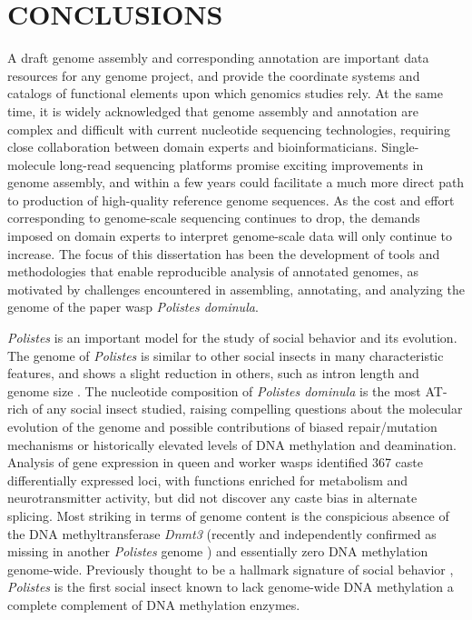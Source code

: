 \chapter{CONCLUSIONS}

A draft genome assembly and corresponding annotation are important data resources for any genome project, and provide the coordinate systems and catalogs of functional elements upon which genomics studies rely.
At the same time, it is widely acknowledged that genome assembly and annotation are complex and difficult with current nucleotide sequencing technologies, requiring close collaboration between domain experts and bioinformaticians.
Single-molecule long-read sequencing platforms promise exciting improvements in genome assembly, and within a few years could facilitate a much more direct path to production of high-quality reference genome sequences.
As the cost and effort corresponding to genome-scale sequencing continues to drop, the demands imposed on domain experts to interpret genome-scale data will only continue to increase.
The focus of this dissertation has been the development of tools and methodologies that enable reproducible analysis of annotated genomes, as motivated by challenges encountered in assembling, annotating, and analyzing the genome of the paper wasp \textit{Polistes dominula}.

\textit{Polistes} is an important model for the study of social behavior and its evolution.
The genome of \textit{Polistes} is similar to other social insects in many characteristic features, and shows a slight reduction in others, such as intron length and genome size \cite{PdomGenome}.
The nucleotide composition of \textit{Polistes dominula} is the most AT-rich of any social insect studied, raising compelling questions about the molecular evolution of the genome and possible contributions of biased repair/mutation mechanisms or historically elevated levels of DNA methylation and deamination.
Analysis of gene expression in queen and worker wasps identified 367 caste differentially expressed loci, with functions enriched for metabolism and neurotransmitter activity, but did not discover any caste bias in alternate splicing.
Most striking in terms of genome content is the conspicious absence of the DNA methyltransferase \textit{Dnmt3} (recently and independently confirmed as missing in another \textit{Polistes} genome \cite{PcanGenome}) and essentially zero DNA methylation genome-wide.
Previously thought to be a hallmark signature of social behavior \cite{Glastad2011}, \textit{Polistes} is the first social insect known to lack genome-wide DNA methylation a complete complement of DNA methylation enzymes.

